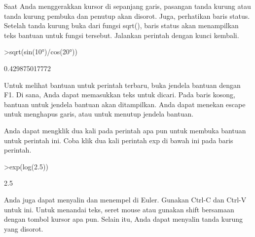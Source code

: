 \documentclass[a4paper,10pt]{article}
\begin{document}
\begin{eulernotebook}
\begin{eulercomment}
\begin{eulercomment}
\begin{eulercomment}
Saat Anda menggerakkan kursor di sepanjang garis, pasangan tanda
kurung atau tanda kurung pembuka dan penutup akan disorot. Juga,
perhatikan baris status. Setelah tanda kurung buka dari fungsi sqrt(),
baris status akan menampilkan teks bantuan untuk fungsi tersebut.
Jalankan perintah dengan kunci kembali.
\end{eulercomment}
\begin{eulerprompt}
>sqrt(sin(10°)/cos(20°))
\end{eulerprompt}
\begin{euleroutput}
  0.429875017772
\end{euleroutput}
\begin{eulercomment}
Untuk melihat bantuan untuk perintah terbaru, buka jendela bantuan
dengan F1. Di sana, Anda dapat memasukkan teks untuk dicari. Pada
baris kosong, bantuan untuk jendela bantuan akan ditampilkan. Anda
dapat menekan escape untuk menghapus garis, atau untuk menutup jendela
bantuan.

Anda dapat mengklik dua kali pada perintah apa pun untuk membuka
bantuan untuk perintah ini. Coba klik dua kali perintah exp di bawah
ini pada baris perintah.
\end{eulercomment}
\begin{eulerprompt}
>exp(log(2.5))
\end{eulerprompt}
\begin{euleroutput}
  2.5
\end{euleroutput}
\begin{eulercomment}
Anda juga dapat menyalin dan menempel di Euler. Gunakan Ctrl-C dan
Ctrl-V untuk ini. Untuk menandai teks, seret mouse atau gunakan shift
bersamaan dengan tombol kursor apa pun. Selain itu, Anda dapat
menyalin tanda kurung yang disorot.


\end{eulercomment}
\end{eulercomment}
\end{eulercomment}
\end{eulernotebook}
\end{document}
